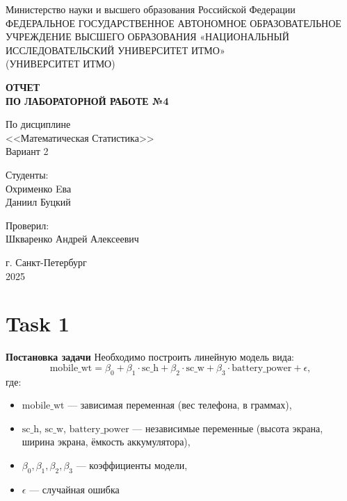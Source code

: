 \documentclass[14pt]{extreport}
\begin{document}
	
	\begin{titlepage}
		\centering
		\vspace*{1cm}
		
		{\large Министерство науки и высшего образования Российской Федерации}\\
		{\large ФЕДЕРАЛЬНОЕ ГОСУДАРСТВЕННОЕ АВТОНОМНОЕ ОБРАЗОВАТЕЛЬНОЕ УЧРЕЖДЕНИЕ ВЫСШЕГО ОБРАЗОВАНИЯ «НАЦИОНАЛЬНЫЙ ИССЛЕДОВАТЕЛЬСКИЙ УНИВЕРСИТЕТ ИТМО»}\\
		{\large (УНИВЕРСИТЕТ ИТМО)}\\
		
		\vspace{1cm}
		
		\textbf{{\Huge ОТЧЕТ}\\
			{\Huge ПО ЛАБОРАТОРНОЙ РАБОТЕ №4}}\\
		
		\vspace{1cm}
		
		{\LARGE По дисциплине\\
			<<Математическая Статистика>>}\\
		Вариант 2
		
		\vspace{2cm}
		
		{\Large Студенты:}\\
		Охрименко Eва\\
		Даниил Буцкий
		
		\vspace{2cm}
		
		{\Large Проверил:}\\
		Шкваренко Андрей Алексеевич\\
		
		\vspace{2cm}
		
		{\large г. Санкт-Петербург}\\
		{\large 2025}
	\end{titlepage}
	
	\tableofcontents
	\newpage
	
	\setcounter{section}{0} %
	
	\section{Task 1}

\textbf{Постановка задачи}
Необходимо построить линейную модель вида:
\begin{equation}
\text{mobile\_wt} = \beta_0 + \beta_1 \cdot \text{sc\_h} + \beta_2 \cdot \text{sc\_w} + \beta_3 \cdot \text{battery\_power} + \epsilon,
\end{equation}
где:
\begin{itemize}
    \item \(\text{mobile\_wt}\) — зависимая переменная (вес телефона, в граммах),
    \item \(\text{sc\_h}\), \(\text{sc\_w}\), \(\text{battery\_power}\) — независимые переменные (высота экрана, ширина экрана, ёмкость аккумулятора),
    \item \(\beta_0, \beta_1, \beta_2, \beta_3\) — коэффициенты модели,
    \item \(\epsilon\) — случайная ошибка
\end{itemize}
\end{document}
